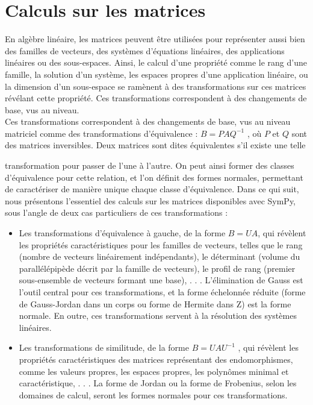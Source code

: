 \section{ Calculs sur les matrices}
En algèbre linéaire, les matrices peuvent être utilisées pour représenter aussi bien des familles de vecteurs, 
des systèmes d’équations linéaires, des applications linéaires ou des sous-espaces. Ainsi, le calcul d’une 
propriété comme le rang d’une famille, la solution d’un système, les espaces propres d’une application linéaire, 
ou la dimension d’un sous-espace se ramènent à des transformations sur ces matrices révélant cette propriété. 
Ces transformations correspondent à des changements de base, vus au niveau.
\\
Ces transformations correspondent à des changements de base, vus au niveau
matriciel comme des transformations d’équivalence : $B = PAQ^{-1}$ , où $P$ et $Q$ sont
des matrices inversibles. Deux matrices sont dites équivalentes s’il existe une telle

transformation pour passer de l’une à l’autre. On peut ainsi former des classes
d’équivalence pour cette relation, et l’on définit des formes normales, permettant
de caractériser de manière unique chaque classe d’équivalence. Dans ce qui suit,
nous présentons l’essentiel des calculs sur les matrices disponibles avec SymPy, sous
l’angle de deux cas particuliers de ces transformations :

\begin{itemize}
 	 \item Les transformations d’équivalence à gauche, de la forme $B = U A$, qui
révèlent les propriétés caractéristiques pour les familles de vecteurs, telles
que le rang (nombre de vecteurs linéairement indépendants), le déterminant
(volume du parallélépipède décrit par la famille de vecteurs), le profil de rang
(premier sous-ensemble de vecteurs formant une base), . . . L’élimination de
Gauss est l’outil central pour ces transformations, et la forme échelonnée
réduite (forme de Gauss-Jordan dans un corps ou forme de Hermite dans Z)
est la forme normale. En outre, ces transformations servent à la résolution
des systèmes linéaires.
	 \item  Les transformations de similitude, de la forme $B = UAU^{-1}$ , qui révèlent les
propriétés caractéristiques des matrices représentant des endomorphismes,
comme les valeurs propres, les espaces propres, les polynômes minimal et
caractéristique, . . . La forme de Jordan ou la forme de Frobenius, selon les
domaines de calcul, seront les formes normales pour ces transformations.

\end{itemize}




